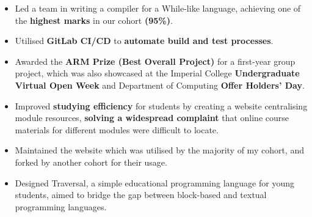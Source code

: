 \documentclass[10pt]{article}
\begin{document}
\begin{itemize}
  \item Led a team in writing a compiler for a While-like language, achieving one of the \textbf{highest marks} in our cohort \textbf{(95\%)}.
  \item Utilised \textbf{GitLab CI/CD} to \textbf{automate build and test processes}.
\end{itemize}
\entrysep


\begin{itemize}
  \item Awarded the \textbf{ARM Prize (Best Overall Project)} for a first-year group project, which was also showcased at the Imperial College \textbf{Undergraduate Virtual Open Week} and Department of Computing \textbf{Offer Holders' Day}.
\end{itemize}
\entrysep

\begin{itemize}
  \item Improved \textbf{studying efficiency} for students by creating a website centralising module resources, \textbf{solving a widespread complaint} that online course materials for different modules were difficult to locate.
  \item Maintained the website which was utilised by the majority of my cohort, and forked by another cohort for their usage.
\end{itemize}
\entrysep

\begin{itemize}
  \item Designed Traversal, a simple educational programming language for young students, aimed to bridge the gap between block-based and textual programming languages.
\end{itemize}
\end{document}
